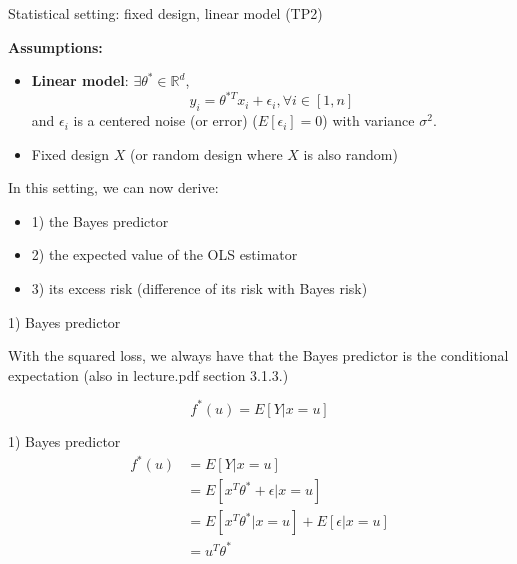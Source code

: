 \documentclass[usenames,dvipsnames]{beamer}
\begin{document}
\begin{frame}{Statistical setting: fixed design, linear model (TP2)}

        \textbf{{Assumptions:}} 
        \begin{itemize}
            \item \textbf{{Linear model}}: $\exists \theta^*\in \mathbb{R}^d$,
                \begin{equation*}
                    y_i = \theta^{*T}x_i+\epsilon_i, \forall i\in [1, n]
                \end{equation*}
                and $\epsilon_i$ is a centered noise (or error)  ($E[\epsilon_i]=0$) with variance $
                \sigma^2$. 
            \item Fixed design $X$ (or random design where $X$ is also random)
        \end{itemize}

        In this setting, we can now derive:
        \begin{itemize}
            \item 1) the Bayes predictor
            \item 2) the expected value of the OLS estimator
	    \item 3) its excess risk (difference of its risk with Bayes risk)
        \end{itemize}

\end{frame}

\begin{frame}{1) Bayes predictor}

    With the squared loss, we always have that the Bayes predictor is the
    conditional expectation (also in lecture\textunderscore .pdf section 3.1.3.)

    \begin{equation}
        f^*(u) = E[Y|x=u]
    \end{equation}
    
\end{frame}

\begin{frame}{1) Bayes predictor}
\begin{equation}
    \begin{aligned}
        \label{eq:}
        f^*(u)&=E[Y|x=u]\\
        &=E[x^T\theta^*+\epsilon|x=u]\\
        &=E[x^T\theta^*|x=u]+E[\epsilon|x=u]\\
        &=u^T\theta^*
    \end{aligned}
\end{equation}
\end{frame}
\end{document}
